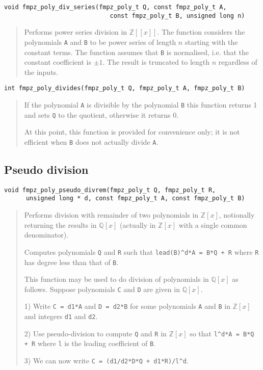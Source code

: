 \documentclass[a4paper,10pt]{article}
\newcommand{\Z}{\mathbb{Z}}
\newcommand{\Q}{\mathbb{Q}}
\newcommand{\code}{\lstinline}
\begin{document}
\begin{lstlisting}
void fmpz_poly_div_series(fmpz_poly_t Q, const fmpz_poly_t A, 
                             const fmpz_poly_t B, unsigned long n) 
\end{lstlisting}
\begin{quote}
Performs power series division in $\Z[[x]]$. The function considers the polynomials \code{A} and \code{B} to be power series of length $n$ starting with the constant terms. The function assumes that \code{B} is normalised, i.e. that the constant coefficient is $\pm 1$. The result is truncated to length $n$ regardless of the inputs.
\end{quote}

\begin{lstlisting}
int fmpz_poly_divides(fmpz_poly_t Q, fmpz_poly_t A, fmpz_poly_t B)
\end{lstlisting}
\begin{quote}
If the polynomial \code{A} is divisible by the polynomial \code{B} this function returns 1 and sets \code{Q} to the quotient, otherwise it returns 0.

At this point, this function is provided for convenience only; it is not efficient when \code{B} does not actually divide \code{A}. 
\end{quote}

\subsection{Pseudo division}

\begin{lstlisting}
void fmpz_poly_pseudo_divrem(fmpz_poly_t Q, fmpz_poly_t R, 
      unsigned long * d, const fmpz_poly_t A, const fmpz_poly_t B)
\end{lstlisting}
\begin{quote}
Performs division with remainder of two polynomials in $\Z[x]$, notionally returning the results in $\Q[x]$ (actually in $\Z[x]$ with a single common denominator).

Computes polynomials \code{Q} and \code{R} such that \code{lead(B)^d*A = B*Q + R} where \code{R} has degree less than that of \code{B}.

This function may be used to do division of polynomials in $\Q[x]$ as follows. Suppose polynomials \code{C} and \code{D} are given in $\Q[x]$. 

1) Write \code{C = d1*A} and \code{D = d2*B} for some polynomials \code{A} and \code{B} in $\Z[x]$ and integers \code{d1} and \code{d2}.

2) Use pseudo-division to compute \code{Q} and \code{R} in $\Z[x]$ so that \code{l^d*A = B*Q + R} where \code{l} is the leading coefficient of \code{B}. 

3) We can now write \code{C = (d1/d2*D*Q + d1*R)/l^d}.
\end{quote}
\end{document}
